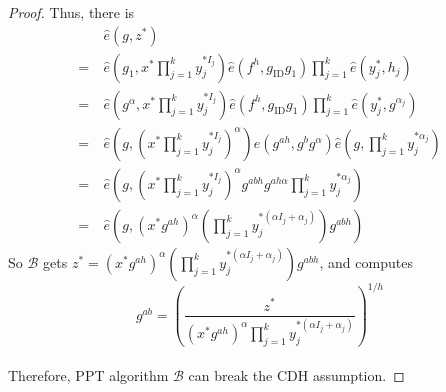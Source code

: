 \documentclass[times]{secauth}
\theoremstyle{definition}
\theoremstyle{remark}
\begin{document}
\begin{proof}
Thus, there is 
\begin{align*}
&\hat{e}(g, z^*) \\
=~&\hat{e}(g_1, x^*\prod_{j=1}^k y_j^{*I_j})\hat{e}(f^h, g_{\mathrm{ID}}g_1)\prod_{j=1}^k \hat{e}(y_j^*, h_j)\\
=~&\hat{e}(g^\alpha, x^*\prod_{j=1}^k y_j^{*I_j}) \hat{e}(f^h, g_{\mathrm{ID}}g_1) \prod_{j=1}^k \hat{e}(y_j^*, g^{\alpha_j})\\
=~&\hat{e}(g, \left(x^*\prod_{j=1}^k y_j^{*I_j}\right)^\alpha)\hat{e}(g^{ah}, g^bg^\alpha) \hat{e}(g, \prod_{j=1}^k y_j^{*\alpha_j})\\
=~&\hat{e}(g, \left(x^*\prod_{j=1}^k y_j^{*I_j}\right)^\alpha g^{abh}g^{ah\alpha} \prod_{j=1}^k y_j^{*\alpha_j})\\
=~&\hat{e}(g, \left(x^*g^{ah}\right)^{\alpha}\left(\prod_{j=1}^k y_j^{*(\alpha I_j+\alpha_j)}\right) g^{abh})
\end{align*}
So $\mathcal{B}$ gets $z^* = \left(x^*g^{ah}\right)^{\alpha}\left(\prod_{j=1}^k y_j^{*(\alpha I_j+\alpha_j)}\right) g^{abh}$, and computes 
$$g^{ab} = \left(\frac{z^*}{\left(x^*g^{ah}\right)^{\alpha}\prod_{j=1}^k y_j^{*(\alpha I_j+\alpha_j)}}\right)^{1/h}$$
\vspace{0.2cm}
\\
Therefore, PPT algorithm $\mathcal{B}$ can break the CDH assumption.
\end{proof}
\end{document}
